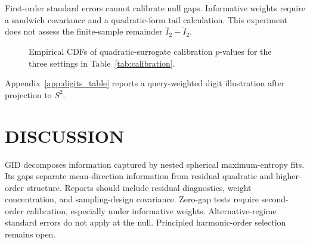 \documentclass[twoside]{article}
\theoremstyle{definition}
\theoremstyle{remark}
\begin{document}
\begin{table}[ht]
\centering
\caption{Finite-sample calibration of the quadratic surrogate $\widetilde I_2$ on $S^2$ with $n=500$: 800 equal-weight and 350 importance-sampling replicates.}
\label{tab:calibration}
\scriptsize
{}
\end{table}

First-order standard errors cannot calibrate null gaps. Informative weights require a sandwich covariance and a quadratic-form tail calculation. This experiment does not assess the finite-sample remainder $\widehat I_2-\widetilde I_2$.

\begin{figure}[th]
\centering

\caption{Empirical CDFs of quadratic-surrogate calibration $p$-values for the three settings in Table~\ref{tab:calibration}.}
\label{fig:calibration_ecdf}
\end{figure}


Appendix~\ref{app:digits_table} reports a query-weighted digit illustration after projection to $S^2$.


\section{DISCUSSION}

GID decomposes information captured by nested spherical maximum-entropy fits. Its gaps separate mean-direction information from residual quadratic and higher-order structure. Reports should include residual diagnostics, weight concentration, and sampling-design covariance. Zero-gap tests require second-order calibration, especially under informative weights. Alternative-regime standard errors do not apply at the null. Principled harmonic-order selection remains open.
\end{document}
